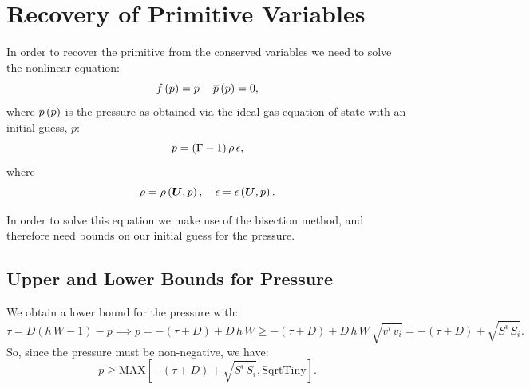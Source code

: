 \documentclass[10pt,preprint]{aastex}
\begin{document}
\newpage
\section{Recovery of Primitive Variables}
In order to recover the primitive from the conserved variables we need to solve the nonlinear equation:
\begin{equation}
    f\left(p\right)=p-\overline{p}\left(p\right)=0,
\end{equation}
where $\overline{p}\left(p\right)$ is the pressure as obtained via the ideal gas equation of state with an initial guess, $p$:
\begin{equation}
    \overline{p}=\left(\Gamma-1\right)\rho\,\epsilon,
\end{equation}
where
\begin{equation}
    \rho=\rho\left(\boldsymbol{U},p\right),\hspace{1em}\epsilon=\epsilon\left(\boldsymbol{U},p\right).
\end{equation}

In order to solve this equation we make use of the bisection method, and therefore need bounds on our initial guess for the pressure.

\subsection{Upper and Lower Bounds for Pressure}
We obtain a lower bound for the pressure with:
\begin{equation}
\tau=D\left(h\,W-1\right)-p\implies p=-\left(\tau+D\right)+D\,h\,W\geq-\left(\tau+D\right)+D\,h\,W\,\sqrt{v^{i}\,v_{i}}=-\left(\tau+D\right)+\sqrt{S^{i}\,S_{i}}.
\end{equation}
So, since the pressure must be non-negative, we have:
\begin{equation}
p\geq\text{MAX}\left[-\left(\tau+D\right)+\sqrt{S^{i}\,S_{i}},\text{SqrtTiny}\right].
\end{equation}
\end{document}
